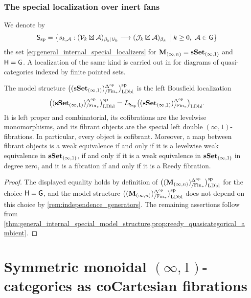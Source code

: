 \documentclass[10pt,reqno]{amsart}
\begin{document}
\subsubsection{The special localization over inert fans}
\label{subsubsec:internal_special_model_structure}

We denote by
\begin{equation}
\label{eq:internal_special_localizers}
\mathsf S_{\mathrm{sp}}=
\left\{
 s_{k,\mathcal A}:
 (\mathcal V_k\boxtimes\mathcal A)_{\beta_k|\mathcal V_k}
 \longrightarrow
 (\mathcal J_k\boxtimes\mathcal A)_{\beta_k}
 \ \middle|\ k\geq0,\ \mathcal A\in\mathsf G
\right\}
\end{equation}
the set \eqref{eq:general_internal_special_localizers} for
$\mathbf M_{(\infty,n)}=\mathbf{sSet}_{(\infty,1)}$ and $\mathsf H=\mathsf G$. A localization
of the same kind is carried out in \cite[\S5]{Sharma2021} for diagrams
of quasi-categories indexed by finite pointed sets.

\begin{theorem}
\label{thm:internal_special_model_structure}
The model structure $\bigl((\mathbf{sSet}_{(\infty,1)})^{\Delta^{\mathrm{op}}}_{/\mathbb{F}\mathrm{in}_*}\bigr)_{\mathrm{LDbl}}^{\mathrm{sp}}$ is the left Bousfield localization
\[
\bigl((\mathbf{sSet}_{(\infty,1)})^{\Delta^{\mathrm{op}}}_{/\mathbb{F}\mathrm{in}_*}\bigr)_{\mathrm{LDbl}}^{\mathrm{sp}}=L_{\mathsf S_{\mathrm{sp}}}\bigl((\mathbf{sSet}_{(\infty,1)})^{\Delta^{\mathrm{op}}}_{/\mathbb{F}\mathrm{in}_*}\bigr)_{\mathrm{LDbl}}.
\]
It is left proper and combinatorial, its cofibrations are the
levelwise monomorphisms, and its fibrant objects are the special left
double $(\infty,1)$-fibrations. In particular, every object is
cofibrant. Moreover, a map between fibrant objects is a weak
equivalence if and only if it is a levelwise weak equivalence in
$\mathbf{sSet}_{(\infty,1)}$, if and only if it is a weak equivalence in
$\mathbf{sSet}_{(\infty,1)}$ in degree zero, and it is a fibration if and
only if it is a Reedy fibration.
\end{theorem}

\begin{proof}
The displayed equality holds by definition of $\bigl((\mathbf M_{(\infty,n)})^{\Delta^{\mathrm{op}}}_{/\mathbb{F}\mathrm{in}_*}\bigr)_{\mathrm{LDbl}}^{\mathrm{sp}}$ for
the choice $\mathsf H=\mathsf G$, and the model structure
$\bigl((\mathbf M_{(\infty,n)})^{\Delta^{\mathrm{op}}}_{/\mathbb{F}\mathrm{in}_*}\bigr)_{\mathrm{LDbl}}^{\mathrm{sp}}$ does not depend on this choice by
\cref{rem:independence_generators}. The remaining assertions follow
from
\cref{thm:general_internal_special_model_structure,prop:reedy_quasicategorical_ambient}.
\end{proof}

\section{Symmetric monoidal \texorpdfstring{$(\infty,1)$}{(infinity,1)}-categories as coCartesian fibrations}
\label{sec:enriched_description}
\end{document}
